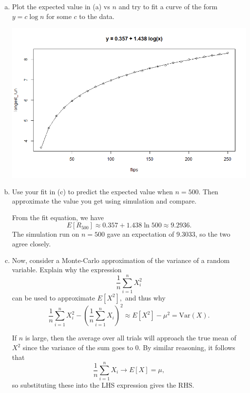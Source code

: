 \documentclass{article}
\newcommand{\var}{\mathrm{Var}}
\begin{document}
\begin{enumerate}
\begin{enumerate}[(a)]
			\item Plot the expected value in (a) vs $n$ and try to fit a curve of the form $y=c\log n$ for some $c$ to the data.
					\begin{center}
						\includegraphics[width=14cm]{longest_run.png}
					\end{center}					

					\newpage
			\item Use your fit in (c) to predict the expected value when $n=500.$ Then approximate the value you get using simulation and compare.
				\begin{soln}
					From the fit equation, we have \[E[R_{500}]\approx 0.357+1.438\ln500 \approx 9.2936. \] The simulation run on $n=500$ gave an expectation of 9.3033, so the two agree closely.
					
				\end{soln}
				
			\item Now, consider a Monte-Carlo approximation of the variance of a random variable. Explain why the expression \[\frac{1}{n}\sum_{i=1}^n X_i^2\] can be used to approximate $E[X^2],$ and thus why \[\frac{1}{n}\sum_{i=1}^n X_i^2 - \left( \frac{1}{n}\sum_{i=1}^n X_i \right)^2 \approx E[X^2]-\mu^2=\var(X).\]
				\begin{soln}
					If $n$ is large, then the average over all trials will approach the true mean of $X^2$ since the variance of the sum goes to 0. By similar reasoning, it follows that \[\frac{1}{n}\sum_{i=1}^{n}X_i\to E[X]=\mu, \] so substituting these into the LHS expression gives the RHS.

				\end{soln}


\end{enumerate}
\end{enumerate}
\end{document}
